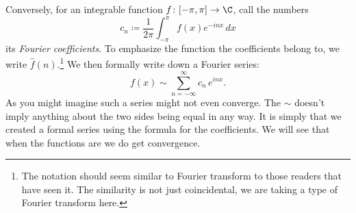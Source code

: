 Conversely, for an integrable function $f \colon [-\pi,\pi] \to
\C$, call the numbers
\begin{equation*}
c_n \coloneqq 
\frac{1}{2\pi} \int_{-\pi}^\pi
f(x) e^{-inx} \, dx
\end{equation*}
its \emph{Fourier coefficients}.  To emphasize the function
the coefficients belong to,
we write $\hat{f}(n)$.\footnote{The notation should seem similar
to Fourier transform to those readers that have seen it.
The similarity is not just
coincidental, we are taking a type of Fourier transform here.}
We then formally write down a Fourier series:
\begin{equation*}
f(x) \sim
\sum_{n=-\infty}^\infty c_n \, e^{inx} .
\end{equation*}
As you might imagine such a series might not even converge.
The $\sim$ doesn't imply anything about the two sides being equal
in any way.  It is simply that we created a formal series using the formula
for the coefficients.  We will see that when the functions are
 we do get convergence.

